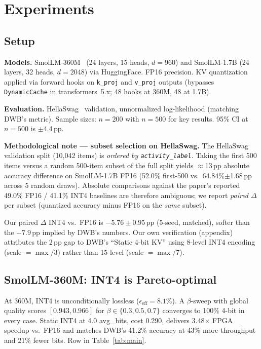 \documentclass{article}
\begin{document}
\section{Experiments}
\label{sec:experiments}

\subsection{Setup}
\textbf{Models.} SmolLM-360M~\citep{smollm} (24 layers, 15 heads, $d=960$) and SmolLM-1.7B (24 layers, 32 heads, $d=2048$) via HuggingFace. FP16 precision. KV quantization applied via forward hooks on \texttt{k\_proj} and \texttt{v\_proj} outputs (bypasses \texttt{DynamicCache} in transformers~5.x; 48 hooks at 360M, 48 at 1.7B).

\textbf{Evaluation.} HellaSwag~\citep{zellers2019hellaswag} validation, unnormalized log-likelihood (matching DWB's metric). Sample sizes: $n{=}200$ with $n{=}500$ for key results. 95\% CI at $n{=}500$ is $\pm 4.4$\,pp.

\textbf{Methodological note --- subset selection on HellaSwag.}
The HellaSwag validation split (10{,}042 items) is \emph{ordered by \texttt{activity\_label}}. Taking the first 500 items versus a random 500-item subset of the full split yields $\approx$13\,pp absolute accuracy difference on SmolLM-1.7B FP16 (52.0\% first-500 vs.\ 64.84\%$\pm$1.68\,pp across 5 random draws). Absolute comparisons against the paper's reported 49.0\% FP16 / 41.1\% INT4 baselines are therefore ambiguous; we report \emph{paired $\Delta$} per subset (quantized accuracy minus FP16 on the \emph{same} subset).

Our paired $\Delta$ INT4 vs.\ FP16 is $-5.76 \pm 0.95$\,pp (5-seed, matched), softer than the $-7.9$\,pp implied by DWB's numbers. Our own verification (appendix) attributes the 2\,pp gap to DWB's ``Static 4-bit KV'' using 8-level INT4 encoding (scale $=\max/3$) rather than 15-level (scale $=\max/7$).

\subsection{SmolLM-360M: INT4 is Pareto-optimal}
At 360M, INT4 is unconditionally lossless ($\epsilon_\text{eff}=8.1\%$). A $\beta$-sweep with global quality scores $[0.943, 0.966]$ for $\beta \in \{0.3, 0.5, 0.7\}$ converges to 100\% 4-bit in every case. Static INT4 at 4.0 avg\_bits, cost 0.290, delivers 3.48$\times$ FPGA speedup vs.\ FP16 and matches DWB's 41.2\% accuracy at 43\% more throughput and 21\% fewer bits. Row in Table~\ref{tab:main}.
\end{document}
